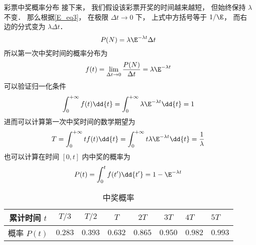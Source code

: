 \begin{example}{彩票中奖概率分布}
接下来， 我们假设该彩票开奖的时间越来越短， 但始终保持 $\lambda$ 不变． 那么根据\autoref{E_eq3}， 在极限 $\Delta t\to 0$ 下， 上式中方括号等于 $1/\E$， 而右边的分式变为 $\lambda \Delta t$．
\begin{equation}
P(N) = \lambda\E^{-\lambda t}\Delta t
\end{equation}
所以第一次中奖时间的概率分布为
\begin{equation}
f(t) = \lim_{\Delta t\to 0} \frac{P(N)}{\Delta t} = \lambda\E^{-\lambda t}
\end{equation}
可以验证归一化条件
\begin{equation}
\int_0^{+\infty} f(t) \dd{t} = \int_0^{+\infty} \lambda\E^{-\lambda t} \dd{t} = 1
\end{equation}
进而可以计算第一次中奖时间的数学期望为
\begin{equation}
T = \int_0^{+\infty} t f(t) \dd{t} = \int_0^{+\infty}t \lambda\E^{-\lambda t} \dd{t} = \frac{1}{\lambda}
\end{equation}
也可以计算在时间 $[0, t]$ 内中奖的概率为
\begin{equation}
P(t) = \int_0^{t} f(t') \dd{t'} = 1 - \E^{-\lambda t}
\end{equation}
\begin{table}[ht]
\centering
\caption{中奖概率}\label{E_tab2}
\begin{tabular}{|c|c|c|c|c|c|}
\hline
累计时间 $t$ & $T/3$  & $T/2$  & $T$     & $2T$ &     $3T$   &  $4T$   & $5T$\\
\hline
概率 $P(t)$ & $0.283$ & $0.393$ & $0.632$ & $0.865$ & $0.950$ & $0.982$ & $0.993$\\
\hline
\end{tabular}
\end{table}
\end{example}
